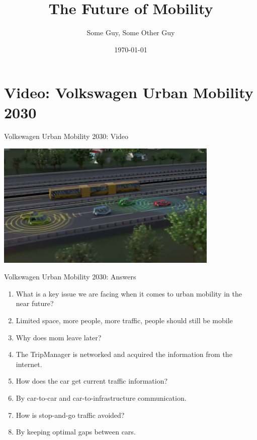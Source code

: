 \documentclass{beamer}
\title{The Future of Mobility}
\date{\today}
\author{Some Guy, Some Other Guy}
\institute{FHNW Brugg-Windisch}
\begin{document}
    \maketitle

    \section{Video: Volkswagen Urban Mobility 2030}

    \begin{frame}{Volkswagen Urban Mobility 2030: Video}
        \begin{center}
            \includegraphics[width=0.8\textwidth]{vw.png}
        \end{center}
    \end{frame}


    \begin{frame}{Volkswagen Urban Mobility 2030: Answers}
        \begin{enumerate}[<+-|alert@+>]
            \item
                What is a key issue we are facing when it comes to urban mobility in the near future?
            \item[]
                Limited space, more people, more traffic, people should still be mobile
            \item
                Why does mom leave later?
            \item[]
                The TripManager is networked and acquired the information from the internet.
            \item
                How does the car get current traffic information?
            \item[]
                By car-to-car and car-to-infrastructure communication.
            \item
                How is stop-and-go traffic avoided?
            \item[]
                By keeping optimal gaps between cars.
            \setcounter{enumTemp}{\theenumi}
        \end{enumerate}
    \end{frame}
\end{document}
